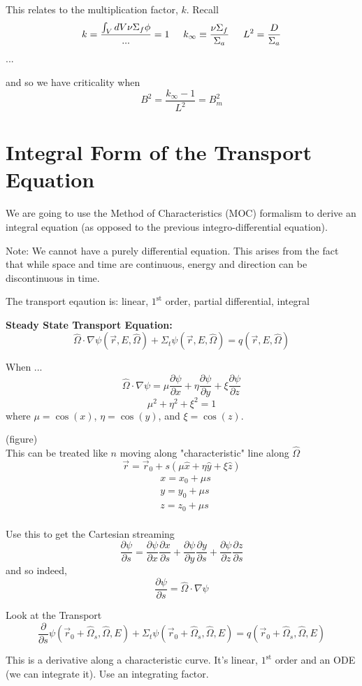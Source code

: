 \documentclass{report}
\newcommand{\h}[1]{\section*{#1}}
\newcommand{\p}{\partial}
\newcommand{\Xs}{\Sigma}
\newcommand{\pos}{\vec{r}}
\newcommand{\Oh}{\hat{\Omega}}
\newcommand{\rEO}{(\pos,E,\Oh)}
\begin{document}
This relates to the multiplication factor, $k$. Recall
$$ k = \frac{\int_V dV \nu\Xs_f\phi}{...} = 1 \hspace{0.5cm} k_{\infty} \equiv \frac{\nu\Xs_f}{\Xs_a} \hspace{0.5cm} L^2 = \frac{D}{\Xs_a} $$
...

and so we have criticality when 
$$ B^2 = \frac{k_{\infty}-1}{L^2} = B_m^2 $$



\h{Integral Form of the Transport Equation}

We are going to use the Method of Characteristics (MOC) formalism to derive an integral equation (as opposed to the previous integro-differential equation).

Note: We cannot have a purely differential equation. This arises from the fact that while space and time are continuous,  energy and direction can be discontinuous in time.

The transport eqaution is: linear, $1^{\text{st}}$ order, partial differential, integral

\textbf{Steady State Transport Equation:}
$$ \Oh\cdot\nabla\psi\rEO + \Xs_t \psi\rEO = q\rEO $$

When ...
$$ \Oh\cdot\nabla\psi = \mu \frac{\p\psi}{\p x} + \eta \frac{\p\psi}{\p y} + \xi \frac{\p\psi}{\p z} $$
$$ \mu^2 + \eta^2 + \xi^2 = 1 $$
where $\mu = \cos(x)$, $\eta = \cos(y)$, and $\xi = \cos(z)$.

(figure)\\

This can be treated like $n$ moving along "characteristic" line along $\Oh$
$$ \pos = \pos_0 + s(\mu\hat{x} + \eta\hat{y} + \xi\hat{z}) $$
\begin{align*}
& x = x_0 + \mu s \\
& y = y_0 + \mu s \\
& z = z_0 + \mu s \\
\end{align*}

Use this to get the Cartesian streaming
$$ \frac{\p \psi}{\p s} = \frac{\p \psi}{\p x} \frac{\p x}{\p s} + \frac{\p \psi}{\p y} \frac{\p y}{\p s} + \frac{\p \psi}{\p z} \frac{\p z}{\p s} $$
and so indeed,
$$ \frac{\p \psi}{\p s} = \Oh\cdot\nabla\psi $$

Look at the Transport 
$$ \frac{\p}{\p s} \psi(\pos_0 + \Oh_s,\Oh,E) + \Xs_t \psi(\pos_0 + \Oh_s,\Oh,E) = q(\pos_0 + \Oh_s,\Oh,E) $$

This is a derivative along a characteristic curve. It's linear, $1^{\text{st}}$ order and an ODE (we can integrate it). Use an integrating factor.
\end{document}
